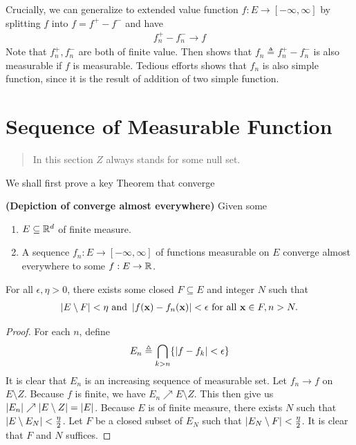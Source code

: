 \documentclass{report}
\begin{document}
\begin{mdframed}
Crucially, we can generalize  to extended value function $f:E\rightarrow [-\infty,\infty]$ by splitting $f$ into $f=f^+-f^-$ and have 
 \begin{align*}
f_n^+-f_n^- \to f
\end{align*}
Note that $f_n^+,f_n^-$ are both of finite value. Then   shows that $f_n\triangleq f_n^+-f_n^-$ is also measurable if $f$ is measurable. Tedious efforts shows that $f_n$ is also simple function, since it is the result of addition of two simple function.  
\end{mdframed}
\section{Sequence of Measurable Function}
\begin{abstract}
In this section $Z$ always stands for some null set.
\end{abstract}
\begin{mdframed}
We shall first prove a key Theorem that converge 
\end{mdframed}
\begin{theorem}
\label{Docae}
\textbf{(Depiction of converge almost everywhere)} Given some
\begin{enumerate}[label=(\alph*)]
  \item $E\subseteq \mathbb{R}^d$ of finite measure.  
  \item A sequence $f_n:E\rightarrow [-\infty,\infty]$ of functions measurable on $E$ converge almost everywhere to some $f:E\rightarrow \mathbb{R}$. 
\end{enumerate}
For all $\epsilon ,\eta>0 $, there exists some closed $F\subseteq E$ and integer $N$ such that
\begin{align*}
  \left|E\setminus F\right|<\eta\text{  and } \left|f(\textbf{x})-f_n(\textbf{x})\right|<\epsilon \text{ for all }\textbf{x} \in F,n>N.  
\end{align*}
\end{theorem}
\begin{proof}
For each $n$, define 
\begin{align*}
E_n \triangleq \bigcap_{k>n}\{ \left|f-f_k\right|<\epsilon  \}
\end{align*}
It is clear that $E_n$ is an increasing sequence of measurable set. Let $f_n \to f$ on $E\setminus Z$. Because  $f$ is finite, we have  $E_n\nearrow E\setminus Z$. This then give us $\left|E_n\right|\nearrow \left|E\setminus Z\right|=\left|E\right|$. Because $E$ is of finite measure, there exists $N$ such that  $\left|E\setminus E_{N}\right|< \frac{\eta }{2}$. Let $F$ be a closed subset of  $E_{N}$ such that $\left|E_{N}\setminus F\right|< \frac{\eta }{2}$. It is clear that $F$ and  $N$ suffices.
\end{proof}
\end{document}
